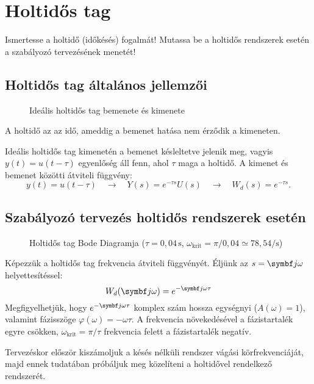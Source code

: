\section{Holtidős tag}

\begin{about}
  Ismertesse a holtidő (időkésés) fogalmát! Mutassa be a holtidős rendszerek
  esetén a szabályozó tervezésének menetét!
\end{about}

\subsection{Holtidős tag általános jellemzői}

\begin{figure}[htb]
  \centering
  
  \caption{Ideális holtidős tag bemenete és kimenete}
  \label{fig:delay}
\end{figure}

A holtidő az az idő, ameddig a bemenet hatása nem érződik a kimeneten.

Ideális holtidős tag kimenetén a bemenet késleltetve jelenik meg, vagyis
$y(t) = u(t - \tau)$ egyenlőség áll fenn, ahol $\tau$ maga a holtidő. A kimenet
és bemenet közötti átviteli függvény:
\begin{equation}
  y(t) = u(t - \tau)
  \quad \rightarrow \quad
  Y(s) = e^{-\tau s} U(s)
  \quad \rightarrow \quad
  W_d(s) = e^{-\tau s}
  .
  \label{eq:delay-W}
\end{equation}

\subsection{Szabályozó tervezés holtidős rendszerek esetén}

\begin{figure}[htb]
  \centering
  \hspace{-4cm}
  
  \caption{
    Holtidős tag Bode Diagramja
    ($\tau=0,04 \, \mathrm s$,
    $\omega_\text{krit} = \pi / 0,04 \simeq 78,54 / \mathrm s$)
  }
  \label{fig:delay-bode}
\end{figure}

Képezzük a holtidős tag frekvencia átviteli függvényét. Éljünk az
$s = \iu \omega$ helyettesítéssel:
\begin{equation}
  W_d(\iu\omega) = e^{-\iu\omega\tau}
  \label{eq:delay-iuw}
\end{equation}
Megfigyelhetjük, hogy $e^{-\iu\omega\tau}$ komplex szám hossza egységnyi
($A(\omega) = 1$), valamint fázisszöge $\varphi(\omega) = -\omega\tau$.
A frekvencia növekedésével a fázistartalék egyre csökken, $\omega_\text{krit} =
  \pi / \tau$ frekvencia felett a fázistartalék negatív.

Tervezéskor először kiszámoljuk a késés nélküli rendszer vágási
körfrekvenciáját, majd ennek tudatában próbáljuk meg közelíteni a holtidővel
rendelkező rendszerét.
